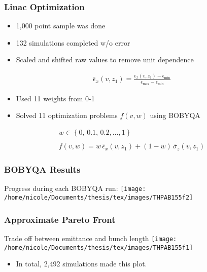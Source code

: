 \documentclass[professionalfonts,t]{beamer}
\begin{document}
\begin{frame}
\frametitle{Linac Optimization}
\begin{itemize}
\item{1,000 point sample was done}
\item{132 simulations completed w/o error}
\item{Scaled and shifted raw values to remove unit dependence}
\end{itemize}
\begin{align*}
\bar{\epsilon}_x (v,z_1) = \frac{ \epsilon_x (v,z_1) - \epsilon_{\min} } { \epsilon_{\max} - \epsilon_{\min} }
\end{align*}

\begin{itemize}
\item{Used 11 weights from 0-1}
\item{Solved 11 optimization problems $f(v,w)$ using BOBYQA}
\end{itemize}
\begin{gather*}
w\in\left\{ 0, \,0.1, \,0.2, \ldots, 1 \right\}\\ \\
f(v,w) = w \,\bar{\epsilon}_x(v,z_1) + (1-w)\, \bar{\sigma}_z(v,z_1)
\end{gather*}


\end{frame}

\begin{frame}
\frametitle{BOBYQA Results}
Progress during each BOBYQA run:
\centering
\texttt{[image: /home/nicole/Documents/thesis/tex/images/THPAB155f2]}
\end{frame}

\begin{frame}
\frametitle{Approximate Pareto Front}
\centering
Trade off between emittance and bunch length
\texttt{[image: /home/nicole/Documents/thesis/tex/images/THPAB155f1]}
\begin{itemize}
\item In total, 2,492 simulations made this plot.
\end{itemize}
\end{frame}
\end{document}
